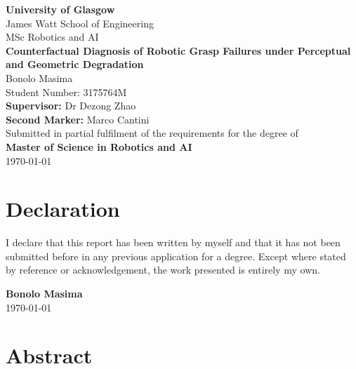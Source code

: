 \documentclass[11pt,a4paper]{report}
\begin{document}
\begin{titlepage}
  \centering
  \vspace*{1cm}

  {\Large\textbf{University of Glasgow}}\\[0.3cm]
  {\large James Watt School of Engineering}\\[0.3cm]
  {\large MSc Robotics and AI}\\[2cm]

  {\LARGE\textbf{Counterfactual Diagnosis of Robotic Grasp Failures under Perceptual and Geometric Degradation}}\\[2cm]

  {\Large Bonolo Masima}\\[0.3cm]
  {\large Student Number: 3175764M}\\[2cm]

  \textbf{Supervisor:} Dr Dezong Zhao\\[0.5cm]
  \textbf{Second Marker:} Marco Cantini \\[2cm]

  Submitted in partial fulfilment of the requirements for the degree of\\
  \textbf{Master of Science in Robotics and AI}\\[1cm]

  \vfill
  {\large \today}
\end{titlepage}

\chapter*{Declaration}

I declare that this report has been written by myself and that it has not been submitted before in any previous application for a degree. Except where stated by reference or acknowledgement, the work presented is entirely my own.

\vspace{2cm}
\noindent
\textbf{Bonolo Masima}\\
\today

\chapter*{Abstract}
\end{document}

